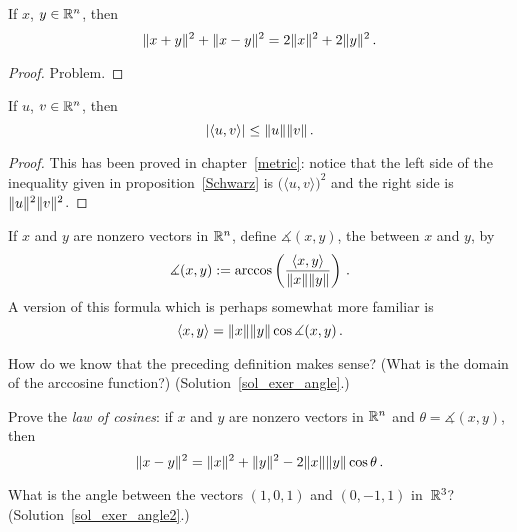 \begin{prop}  If $x$, $y \in \mathbb{R}^n$, then
  \[ \lVert x + y\rVert^2 + \lVert x - y\rVert^2 = 2\lVert x\rVert^2 + 2\lVert y\rVert^2\,. \]
\end{prop}

\begin{proof} Problem.   \ns  \end{proof}

\begin{prop}\label{Schwarz_ineq}  If $u$, $v \in \mathbb{R}^n$, then
  \[ \lvert\langle u , v \rangle\rvert \le \lVert u\rVert \lVert v\rVert\,. \]
\end{prop}

\begin{proof} This has been proved in chapter~\ref{metric}: notice that the left side of the
inequality given in proposition~\ref{Schwarz} is $\bigl(\langle u , v \rangle\bigr)^2$ and the
right side is $\lVert u\rVert^2  \lVert v\rVert^2$.
\end{proof}

\begin{defn}  If $x$ and $y$ are nonzero vectors in $\mathbb{R}^n$, define $\measuredangle(x,y)$, the
 between $x$ and $y$, by
  \[ \measuredangle(x,y)
             :=  \arccos \left(\frac{\langle x , y \rangle}{\lVert x\rVert \lVert y\rVert}\right)\,. \]
A version of this formula which is perhaps somewhat more familiar is
  \[ \langle x,y \rangle = \lVert x\rVert\lVert y\rVert\cos\measuredangle(x,y)\,. \]
\end{defn}

\begin{exer}\label{exer_angle} How do we know that the preceding definition makes sense?
(What is the domain of the arccosine function?)  (Solution~\ref{sol_exer_angle}.)
\end{exer}

\begin{prob}  Prove the
\emph{law of cosines}: if $x$ and $y$ are nonzero vectors in $\mathbb{R}^n$ and $\theta =
\measuredangle(x,y)$, then
  \[ \lVert x-y\rVert^2 = \lVert x\rVert^2 + \lVert y\rVert^2 - 2\lVert x\rVert\lVert y\rVert\cos\theta\,. \]
\end{prob}

\begin{exer}\label{exer_angle2} What is the angle between the vectors $(1,0,1)$ and $(0,-1,1)$
in~$\mathbb{R}^3$?   (Solution~\ref{sol_exer_angle2}.)
\end{exer}

